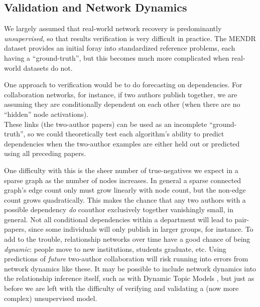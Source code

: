 \documentclass[%
	12pt,
		oneside,
		letterpaper
]{book}
\begin{document}
\subsection{Validation and Network
Dynamics}\label{validation-and-network-dynamics}

We largely assumed that real-world network recovery is predominantly
\emph{unsupervised}, so that results verification is very difficult in
practice. The MENDR dataset provides an initial foray into standardized
reference problems, each having a ``ground-truth'', but this becomes
much more complicated when real-world datasets do not.

One approach to verification would be to do forecasting on dependencies.
For collaboration networks, for instance, if two authors publish
together, we are assuming they are conditionally dependent on each other
(when there are no ``hidden'' node activations).\\
These links (the two-author papers) can be used as an incomplete
``ground-truth'', so we could theoretically test each algorithm's
ability to predict dependencies when the two-author examples are either
held out or predicted using all preceding papers.

One difficulty with this is the sheer number of true-negatives we expect
in a sparse graph as the number of nodes increases. In general a sparse
connected graph's edge count only must grow linearly with node count,
but the non-edge count grows quadratically. This makes the chance that
any two authors with a possible dependency \emph{do} coauthor
exclusively together vanishingly small, in general. Not all conditional
dependencies within a department will lead to pair-papers, since some
individuals will only publish in larger groups, for instance. To add to
the trouble, relationship networks over time have a good chance of being
\emph{dynamic}: people move to new institutions, students graduate, etc.
Using predictions of \emph{future} two-author collaboration will risk
running into errors from network dynamics like these. It may be possible
to include network dynamics into the relationship inference itself, such
as with Dynamic Topic Models \autocite{Dynamictopicmodels_Blei2006}, but
just as before we are left with the difficulty of verifying and
validating a (now more complex) unsupervised model.
\end{document}
